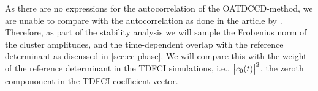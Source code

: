 
        As there are no expressions for the autocorrelation of the
        OATDCCD-method, we are unable to compare with the autocorrelation as
        done in the article by \citeauthor{pedersen2018symplectic}.
        Therefore, as part of the stability analysis we will sample the
        Frobenius norm of the cluster amplitudes, and the time-dependent overlap
        with the reference determinant as discussed in \autoref{sec:cc-phase}.
        We will compare this with the weight of the reference determinant in the
        TDFCI simulations, i.e., $\abs{c_0(t)}^2$, the zeroth compononent in the
        TDFCI coefficient vector.

